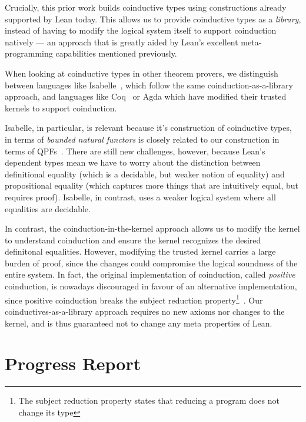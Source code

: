 \documentclass[a4paper]{scrartcl}
\begin{document}
Crucially, this prior work builds coinductive types using constructions
already supported by Lean today. This allows us to provide coinductive
types as a \emph{library}, instead of having to modify the logical
system itself to support coinduction natively --- an approach that is
greatly aided by Lean's excellent meta-programming capabilities
mentioned previously.

When looking at coinductive types in other theorem provers, we
distinguish between languages like Isabelle~\cite{traytelCategoryTheoryBased}, which follow the same
coinduction-as-a-library approach, and languages like Coq~\cite{gimenezTutorialRecursiveTypes1998,gimenezApplicationCoinductiveTypes1996}
or Agda which have modified their trusted kernels to support
coinduction.

Isabelle, in particular, is relevant because it's construction of
coinductive types, in terms of \emph{bounded natural functors} is
closely related to our construction in terms of QPFs~\cite{furerQuotientsBoundedNatural2022}. 
There are still new
challenges, however, because Lean's dependent types mean we have to
worry about the distinction between definitional equality (which is a
decidable, but weaker notion of equality) and propositional equality
(which captures more things that are intuitively equal, but requires
proof). Isabelle, in contrast, uses a weaker logical system where all
equalities are decidable.

In contrast, the coinduction-in-the-kernel approach allows us to modify
the kernel to understand coinduction and ensure the kernel recognizes
the desired definitonal equalities. However, modifying the trusted
kernel carries a large burden of proof, since the changes could
compromise the logical soundness of the entire system. In fact, the
original implementation of coinduction, called \emph{positive}
coinduction, is nowadays discouraged in favour of an alternative
implementation, since positive coinduction breaks the subject reduction
property\footnote{The subject reduction property states that reducing a program does not change its type}~\cite{sozeauCorrectCompleteType}.
Our coinductives-as-a-library approach requires no new axioms nor
changes to the kernel, and is thus guaranteed not to change any meta
properties of Lean.


\section{Progress Report}\label{progress-report}
\end{document}

